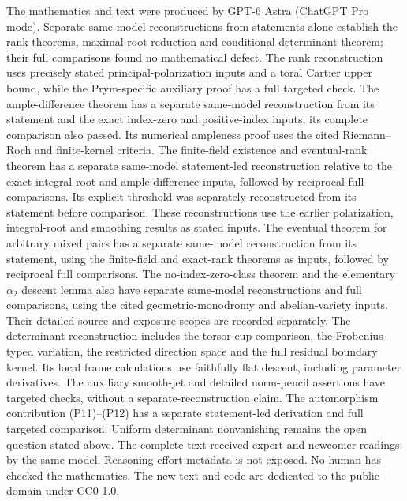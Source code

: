 \documentclass[11pt]{article}
\theoremstyle{definition}\newtheorem{definition}[theorem]{Definition}
\theoremstyle{remark}\newtheorem{remark}[theorem]{Remark}
\begin{document}
The mathematics and text were produced by GPT-6 Astra (ChatGPT Pro mode). Separate same-model reconstructions from statements alone establish the rank theorems, maximal-root reduction and conditional determinant theorem; their full comparisons found no mathematical defect. The rank reconstruction uses precisely stated principal-polarization inputs and a toral Cartier upper bound, while the Prym-specific auxiliary proof has a full targeted check. The ample-difference theorem has a separate same-model reconstruction from its statement and the exact index-zero and positive-index inputs; its complete comparison also passed. Its numerical ampleness proof uses the cited Riemann--Roch and finite-kernel criteria. The finite-field existence and eventual-rank theorem has a separate same-model statement-led reconstruction relative to the exact integral-root and ample-difference inputs, followed by reciprocal full comparisons. Its explicit threshold was separately reconstructed from its statement before comparison. These reconstructions use the earlier polarization, integral-root and smoothing results as stated inputs. The eventual theorem for arbitrary mixed pairs has a separate same-model reconstruction from its statement, using the finite-field and exact-rank theorems as inputs, followed by reciprocal full comparisons. The no-index-zero-class theorem and the elementary $\alpha_2$ descent lemma also have separate same-model reconstructions and full comparisons, using the cited geometric-monodromy and abelian-variety inputs. Their detailed source and exposure scopes are recorded separately. The determinant reconstruction includes the torsor-cup comparison, the Frobenius-typed variation, the restricted direction space and the full residual boundary kernel. Its local frame calculations use faithfully flat descent, including parameter derivatives. The auxiliary smooth-jet and detailed norm-pencil assertions have targeted checks, without a separate-reconstruction claim. The automorphism contribution (P11)--(P12) has a separate statement-led derivation and full targeted comparison. Uniform determinant nonvanishing remains the open question stated above. The complete text received expert and newcomer readings by the same model. Reasoning-effort metadata is not exposed. No human has checked the mathematics. The new text and code are dedicated to the public domain under CC0 1.0.
\end{document}
